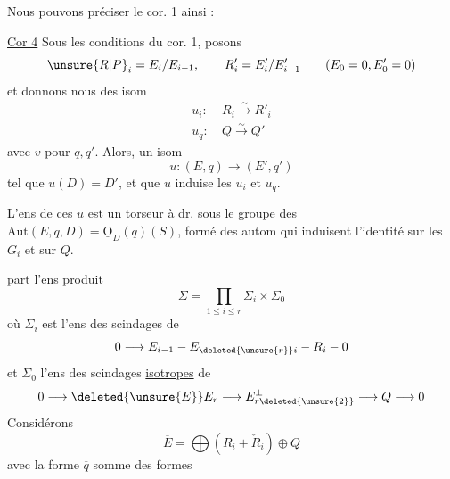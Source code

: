 
Nous pouvons préciser le cor. 1 ainsi :

\uline{Cor 4} Sous les conditions du cor. 1, posons  
\[
\unsure{R|P}_i=E_i/E_{i-1},\qquad R'_i=E'_i/E'_{i-1}\qquad(E_0=0,E'_0=0)
\]
et donnons nous des isom
\[
\begin{aligned}
u_i:\ &R_i\xrightarrow{\sim}R'_i\\
u_q:\ &Q\xrightarrow{\sim}Q'
\end{aligned}
\]
avec $v$  pour $q,q'$. Alors,    un isom
\[
u:(E,q)\longrightarrow(E',q')
\]
tel que $u(D)=D'$, et que $u$ induise les $u_i$ et $u_q$.

 L'ens de ces $u$ est  un torseur à dr. sous le  groupe  des  $\mathrm{Aut}(E,q,D)=\underline{\mathrm O}_D(q)(S)$, formé des autom qui induisent l'identité sur les $G_i$ et sur $Q$.

  part l'ens  produit
\[
\Sigma=\prod_{1\leq i\leq r}\Sigma_i\times\Sigma_0
\]
où $\Sigma_i$ est l'ens des scindages de
\[
0\longrightarrow E_{i-1}\mathbin{-}E_{\deleted{\unsure{r}}i}\mathbin{-}R_i\mathbin{-}0
\]
et $\Sigma_0$ l'ens des scindages \uline{isotropes} de
\[
0\longrightarrow\deleted{\unsure{E}}E_r\longrightarrow E_{r\deleted{\unsure{2}}}^{\perp}\longrightarrow Q\longrightarrow0
\]
 Considérons  
\[
\overline E=\bigoplus(R_i+\check R_i)\oplus Q
\]
avec la forme $\overline q$ somme des formes
